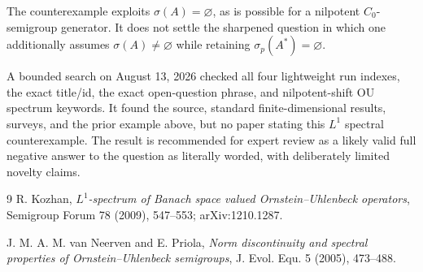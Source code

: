 \documentclass[11pt]{article}
\newcommand{\spec}{\sigma}
\begin{document}
The counterexample exploits $\spec(A)=\varnothing$, as is possible for a
nilpotent $C_0$-semigroup generator.  It does not settle the sharpened question
in which one additionally assumes $\spec(A)\neq\varnothing$ while retaining
$\spec_p(A^*)=\varnothing$.

A bounded search on August 13, 2026 checked all four lightweight run indexes,
the exact title/id, the exact open-question phrase, and nilpotent-shift OU
spectrum keywords.  It found the source, standard finite-dimensional results,
surveys, and the prior example above, but no paper stating this $L^1$ spectral
counterexample.  The result is recommended for expert review as a likely valid
full negative answer to the question as literally worded, with deliberately
limited novelty claims.

\begin{thebibliography}{9}
R. Kozhan,
\emph{$L^1$-spectrum of Banach space valued Ornstein--Uhlenbeck operators},
Semigroup Forum 78 (2009), 547--553; arXiv:1210.1287.

J. M. A. M. van Neerven and E. Priola,
\emph{Norm discontinuity and spectral properties of Ornstein--Uhlenbeck
semigroups},
J. Evol. Equ. 5 (2005), 473--488.
\end{thebibliography}
\end{document}
